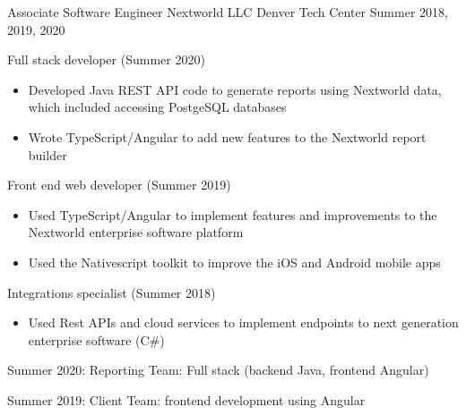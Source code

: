 \vspace{-2.0mm}

\begin{cventries}

  \cventry
    {Associate Software Engineer} %
    {Nextworld LLC} %
    {Denver Tech Center} %
    {Summer 2018, 2019, 2020} %
    {
      \begin{cvitems} %
        \ifcv
      \item {Full stack developer (Summer 2020)}
      \begin{itemize}
        \item {Developed Java REST API code to generate reports using Nextworld data, which included accessing PostgeSQL databases}
        \item {Wrote TypeScript/Angular to add new features to the Nextworld report builder}
      \end{itemize}
      \item {Front end web developer (Summer 2019)}
      \begin{itemize}
            \item {Used TypeScript/Angular to implement features and
    improvements to the Nextworld enterprise software platform}
        \item {Used the Nativescript toolkit to improve the iOS and
    Android mobile apps}
    \end{itemize}
        \item {Integrations specialist (Summer 2018)}
        \begin{itemize}
                \item {Used Rest APIs and cloud services to implement
                            endpoints to next generation enterprise software (C\#)}
    \end{itemize}
    \else
    \item {Summer 2020: Reporting Team: Full stack (backend Java, frontend Angular)}
    \item {Summer 2019: Client Team: frontend development using Angular}

\end{cvitems}}
\end{cventries}
